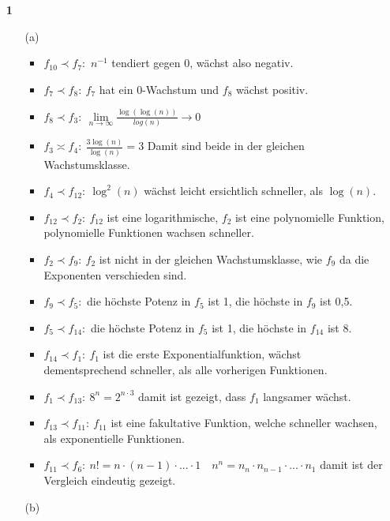 \documentclass[a4paper,11pt,fleqn]{scrartcl}
\title{\titleinfo}
\author{\authorinfo}
\begin{document}
\maketitle
	\begin{enumerate}
		\item[\textbf{1}]
		\begin{enumerate}
			\item[(a)]\quad \\
			\begin{itemize}
  				\item $f_{10} \prec f_7:$ $n^{-1}$ tendiert gegen 0, wächst also negativ.
  				\item $f_7 \prec f_8:\ f_7$ hat ein 0-Wachstum und $f_8$ wächst positiv.
  				\item $f_8 \prec f_3:\ \lim\limits_{n\rightarrow \infty}\frac{\log(\log(n))}{log(n)}\rightarrow 0$
  				\item $f_3 \asymp f_4:\ \frac{3\log(n)}{\log(n)} = 3$ Damit sind beide in der gleichen Wachstumsklasse.
  				\item $f_4 \prec f_{12}:\ \log^2(n)$ wächst leicht ersichtlich schneller, als $\log(n)$.
  				\item $f_{12} \prec f_2:\ f_{12}$ ist eine logarithmische, $f_2$ ist eine polynomielle Funktion, polynomielle Funktionen wachsen schneller.
  				\item $f_2 \prec f_9:\ f_2$ ist nicht in der gleichen Wachstumsklasse, wie $f_9$ da die Exponenten verschieden sind.
  				\item $f_9 \prec f_5:$ die höchste Potenz in $f_5$ ist 1, die höchste in $f_9$ ist 0,5.
  				\item $f_5 \prec f_{14}:$ die höchste Potenz in $f_5$ ist 1, die höchste in $f_{14}$ ist 8.
  				\item $f_{14} \prec f_1:\ f_1$ ist die erste Exponentialfunktion, wächst dementsprechend schneller, als alle vorherigen Funktionen.
  				\item $f_1 \prec f_{13}:\ 8^n = 2^{n\cdot 3}$ damit ist gezeigt, dass $f_1$ langsamer wächst.
  				\item $f_{13} \prec f_{11}:\ f_{11}$ ist eine fakultative Funktion, welche schneller wachsen, als exponentielle Funktionen.
  				\item $f_{11} \prec f_6:\ n! = n\cdot (n-1) \cdot ... \cdot 1\quad n^n = n_n \cdot n_{n-1} \cdot ... \cdot n_1$ damit ist der Vergleich eindeutig gezeigt.
			\end{itemize}
			\item[(b)]\quad \\

\end{enumerate}
\end{enumerate}
\end{document}
